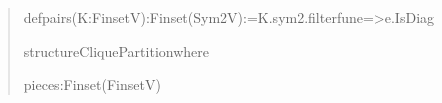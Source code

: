 \documentclass[spanish,11pt,a4paper]{article}
\newlength{\LeanCharWidth}
\begin{document}
\begin{quote}\fontsize{8.5}{10.2}\selectfont\ttfamily\raggedright\setlength{\parskip}{0pt}\settowidth{\LeanCharWidth}{0}
\noindent def\hspace*{\dimexpr 1\LeanCharWidth\relax}pairs\hspace*{\dimexpr 1\LeanCharWidth\relax}(K\hspace*{\dimexpr 1\LeanCharWidth\relax}:\hspace*{\dimexpr 1\LeanCharWidth\relax}Finset\hspace*{\dimexpr 1\LeanCharWidth\relax}V)\hspace*{\dimexpr 1\LeanCharWidth\relax}:\hspace*{\dimexpr 1\LeanCharWidth\relax}Finset\hspace*{\dimexpr 1\LeanCharWidth\relax}(Sym2\hspace*{\dimexpr 1\LeanCharWidth\relax}V)\hspace*{\dimexpr 1\LeanCharWidth\relax}:=\hspace*{\dimexpr 1\LeanCharWidth\relax}K.sym2.filter\hspace*{\dimexpr 1\LeanCharWidth\relax}fun\hspace*{\dimexpr 1\LeanCharWidth\relax}e\hspace*{\dimexpr 1\LeanCharWidth\relax}=>\hspace*{\dimexpr 1\LeanCharWidth\relax}{\LeanSymbols ¬}\hspace*{\dimexpr 1\LeanCharWidth\relax}e.IsDiag\par
\noindent \strut\par
\noindent structure\hspace*{\dimexpr 1\LeanCharWidth\relax}CliquePartition\hspace*{\dimexpr 1\LeanCharWidth\relax}where\par
\noindent \hspace*{\dimexpr 2\LeanCharWidth\relax}pieces\hspace*{\dimexpr 1\LeanCharWidth\relax}:\hspace*{\dimexpr 1\LeanCharWidth\relax}Finset\hspace*{\dimexpr 1\LeanCharWidth\relax}(Finset\hspace*{\dimexpr 1\LeanCharWidth\relax}V)\par

\end{quote}
\end{document}
